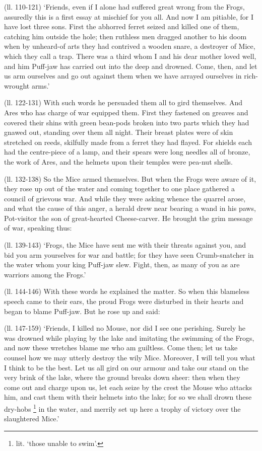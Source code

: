 (ll. 110-121) ‘Friends, even if I alone had suffered great wrong from the
Frogs, assuredly this is a first essay at mischief for you all. And now I am
pitiable, for I have lost three sons. First the abhorred ferret seized and
killed one of them, catching him outside the hole; then ruthless men dragged
another to his doom when by unheard-of arts they had contrived a wooden snare,
a destroyer of Mice, which they call a trap. There was a third whom I and his
dear mother loved well, and him Puff-jaw has carried out into the deep and
drowned. Come, then, and let us arm ourselves and go out against them when we
have arrayed ourselves in rich-wrought arms.’

(ll. 122-131) With such words he persuaded them all to gird themselves. And
Ares who has charge of war equipped them. First they fastened on greaves and
covered their shins with green bean-pods broken into two parts which they had
gnawed out, standing over them all night. Their breast plates were of skin
stretched on reeds, skilfully made from a ferret they had flayed. For shields
each had the centre-piece of a lamp, and their spears were long needles all of
bronze, the work of Ares, and the helmets upon their temples were pea-nut
shells.

(ll. 132-138) So the Mice armed themselves. But when the Frogs were aware of
it, they rose up out of the water and coming together to one place gathered a
council of grievous war. And while they were asking whence the quarrel arose,
and what the cause of this anger, a herald drew near bearing a wand in his
paws, Pot-visitor the son of great-hearted Cheese-carver. He brought the grim
message of war, speaking thus:

(ll. 139-143) ‘Frogs, the Mice have sent me with their threats against
you, and bid you arm yourselves for war and battle; for they have seen
Crumb-snatcher in the water whom your king Puff-jaw slew. Fight, then, as many
of you as are warriors among the Frogs.’

(ll. 144-146) With these words he explained the matter. So when this blameless
speech came to their ears, the proud Frogs were disturbed in their hearts and
began to blame Puff-jaw. But he rose up and said:

(ll. 147-159) ‘Friends, I killed no Mouse, nor did I see one perishing.
Surely he was drowned while playing by the lake and imitating the swimming of
the Frogs, and now these wretches blame me who am guiltless. Come then; let us
take counsel how we may utterly destroy the wily Mice. Moreover, I will tell
you what I think to be the best. Let us all gird on our armour and take our
stand on the very brink of the lake, where the ground breaks down sheer: then
when they come out and charge upon us, let each seize by the crest the Mouse
who attacks him, and cast them with their helmets into the lake; for so we
shall drown these dry-hobs \footnote{lit. ‘those unable
to swim’.} in the water, and merrily set up
here a trophy of victory over the slaughtered Mice.’

